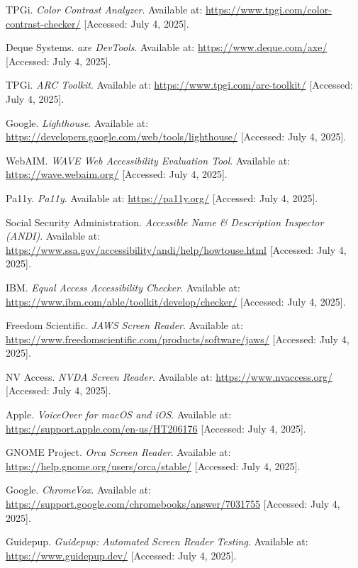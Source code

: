 \begin{thebibliography}{99}
 TPGi. \textit{Color Contrast Analyzer}. Available at: \url{https://www.tpgi.com/color-contrast-checker/} [Accessed: July 4, 2025].

 Deque Systems. \textit{axe DevTools}. Available at: \url{https://www.deque.com/axe/} [Accessed: July 4, 2025].

 TPGi. \textit{ARC Toolkit}. Available at: \url{https://www.tpgi.com/arc-toolkit/} [Accessed: July 4, 2025].

 Google. \textit{Lighthouse}. Available at: \url{https://developers.google.com/web/tools/lighthouse/} [Accessed: July 4, 2025].

 WebAIM. \textit{WAVE Web Accessibility Evaluation Tool}. Available at: \url{https://wave.webaim.org/} [Accessed: July 4, 2025].

 Pa11y. \textit{Pa11y}. Available at: \url{https://pa11y.org/} [Accessed: July 4, 2025].

 Social Security Administration. \textit{Accessible Name & Description Inspector (ANDI)}. Available at: \url{https://www.ssa.gov/accessibility/andi/help/howtouse.html} [Accessed: July 4, 2025].

 IBM. \textit{Equal Access Accessibility Checker}. Available at: \url{https://www.ibm.com/able/toolkit/develop/checker/} [Accessed: July 4, 2025].

 Freedom Scientific. \textit{JAWS Screen Reader}. Available at: \url{https://www.freedomscientific.com/products/software/jaws/} [Accessed: July 4, 2025].

 NV Access. \textit{NVDA Screen Reader}. Available at: \url{https://www.nvaccess.org/} [Accessed: July 4, 2025].

 Apple. \textit{VoiceOver for macOS and iOS}. Available at: \url{https://support.apple.com/en-us/HT206176} [Accessed: July 4, 2025].

 GNOME Project. \textit{Orca Screen Reader}. Available at: \url{https://help.gnome.org/users/orca/stable/} [Accessed: July 4, 2025].

 Google. \textit{ChromeVox}. Available at: \url{https://support.google.com/chromebooks/answer/7031755} [Accessed: July 4, 2025].

 Guidepup. \textit{Guidepup: Automated Screen Reader Testing}. Available at: \url{https://www.guidepup.dev/} [Accessed: July 4, 2025].

\end{thebibliography}
